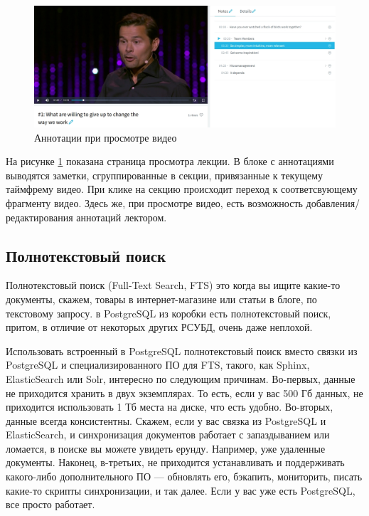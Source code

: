 \FloatBarrier

\begin{figure}
  \centering
  \includegraphics[width=1\textwidth]{images/annotations.jpg}
  \caption{Аннотации при просмотре видео}\label{annotations}
\end{figure}

На рисунке \ref{annotations} показана страница просмотра лекции. В блоке с аннотациями
выводятся заметки, сгруппированные в секции, привязанные к текущему таймфрему видео.
При клике на секцию происходит переход к соответсвующему фрагменту видео. Здесь же, при просмотре
видео, есть возможность добавления/редактирования аннотаций лектором.

\FloatBarrier

\subsection{Полнотекстовый поиск}

Полнотекстовый поиск (Full-Text Search, FTS) это когда вы ищите какие-то документы,
скажем, товары в интернет-магазине или статьи в блоге, по текстовому запросу. в PostgreSQL из коробки есть
полнотекстовый поиск, притом, в отличие от некоторых других РСУБД, очень даже неплохой.

Использовать встроенный в PostgreSQL полнотекстовый поиск вместо связки из PostgreSQL и специализированного ПО для FTS,
такого, как Sphinx, ElasticSearch или Solr, интересно по следующим причинам.
Во-первых, данные не приходится хранить в двух экземплярах. То есть, если у вас 500 Гб данных, не приходится использовать
1 Тб места на диске, что есть удобно. Во-вторых, данные всегда консистентны.
Скажем, если у вас связка из PostgreSQL и ElasticSearch, и синхронизация документов работает с запаздыванием
или ломается, в поиске вы можете увидеть ерунду. Например, уже удаленные документы.
Наконец, в-третьих, не приходится устанавливать и поддерживать какого-либо дополнительного ПО —
обновлять его, бэкапить, мониторить, писать какие-то скрипты синхронизации, и так далее.
Если у вас уже есть PostgreSQL, все просто работает.

